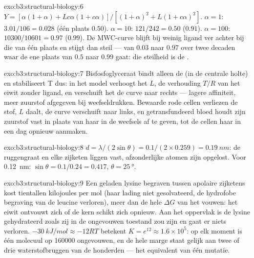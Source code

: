 \begin{solution}{exo:b3:structural-biology:6}
$Y = [\alpha(1+\alpha) + Lc\alpha(1+c\alpha)]/[(1+\alpha)^{2} +
L(1+c\alpha)^{2}]$. $\alpha = 1$: $3.01/106 = 0.028$ (één plaats
$0.50$). $\alpha = 10$: $121/242 = 0.50$ ($0.91$). $\alpha = 100$:
$\num{10300}/\num{10601} = 0.97$ ($0.99$). De MWC-curve blijft bij
weinig ligand ver achter bij die van één plaats en stijgt dan steil ---
van $0.03$ naar $0.97$ over twee decaden waar de ene plaats van $0.5$
naar $0.99$ gaat: die steilheid is de .
\end{solution}

\begin{solution}{exo:b3:structural-biology:7}
Bisfosfoglyceraat bindt alleen de  (in de centrale holte) en
stabiliseert T dus: in het model verhoogt het $L$, de verhouding $T/R$
van het eiwit zonder ligand, en verschuift het de curve naar rechts ---
lagere affiniteit, meer zuurstof afgegeven bij weefseldrukken. Bewaarde
rode cellen verliezen de stof, $L$ daalt, de curve verschuift naar
links, en getransfundeerd bloed houdt zijn zuurstof vast in plaats van
haar in de weefsels af te geven, tot de cellen haar in een dag opnieuw
aanmaken.
\end{solution}

\begin{solution}{exo:b3:structural-biology:8}
$d = \lambda/(2\sin\theta) = 0.1/(2\times 0.259) = \qty{0.19}{nm}$: de
ruggengraat en elke zijketen liggen vast, afzonderlijke atomen zijn
opgelost. Voor \qty{0.12}{nm}: $\sin\theta = 0.1/0.24 = 0.417$, $\theta =
\qty{25}{\degree}$.
\end{solution}

\begin{solution}{exo:b3:structural-biology:9}
Een geladen lysine begraven tussen apolaire zijketens kost tientallen
kilojoules per mol (haar lading niet gesolvateerd, de hydrofobe
begraving van de leucine verloren), meer dan de hele $\Delta G$ van het
vouwen: het eiwit ontvouwt zich of de kern schikt zich opnieuw. Aan het
oppervlak is de lysine gehydrateerd zoals zij in de ongevouwen toestand
zou zijn en gaat er niets verloren. $\qty{-30}{kJ/mol} \approx -12RT$
betekent $K = e^{12} \approx 1.6\times
10^{5}$: op elk moment is één molecuul op \num{160000} ongevouwen, en de
hele marge staat gelijk aan twee of drie waterstofbruggen van de
honderden --- het equivalent van één mutatie.
\end{solution}

